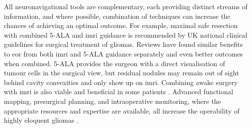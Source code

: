 All neuronavigational tools are complementary, each providing distinct streams of information, and where possible, combination of techniques can increase the chances of achieving an optimal outcome.
For example, maximal safe resection with combined 5-ALA and \gls{imri} guidance is recommended by UK national clinical guidelines for surgical treatment of gliomas\autocite{NICE2021}.
Reviews have found similar benefits to \gls{eor} from both \gls{imri} and 5-ALA guidance separately\autocite{Golub2020} and even better outcomes when combined\autocite{Nickel2018,Coburger2019}.
5-ALA provides the surgeon with a direct visualisation of tumour cells in the surgical view, but residual nodules may remain out of sight behind cavity convexities and only show up on \gls{imri}\autocite{SueroMolina2019}.
Combining awake surgery with \gls{imri} is also viable and beneficial in some patients \autocite{Motomura2017,Tuleasca2021}.
Advanced functional mapping, presurgical planning, and intraoperative monitoring, where the appropriate resources and expertise are available\autocite{GeorgeZakiGhali2020}, all increase the operability of highly eloquent gliomas
\autocite{Bello2008,Krieg2013,DellaPuppa2013b,Magill2018}.
